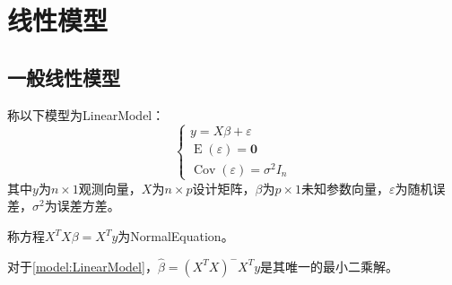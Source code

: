 \chapter{线性模型}

\section{一般线性模型}
\begin{definition}\label{model:LinearModel}
	称以下模型为\gls{LinearModel}：
	\begin{equation*}
		\begin{cases}
			y=X\beta+\varepsilon \\
			\operatorname{E}(\varepsilon)=\mathbf{0} \\
			\operatorname{Cov}(\varepsilon)=\sigma^2I_n
		\end{cases}
	\end{equation*}
	其中$y$为$n\times 1$观测向量，$X$为$n\times p$设计矩阵，$\beta$为$p\times 1$未知参数向量，$\varepsilon$为随机误差，$\sigma^2$为误差方差。
\end{definition}
\begin{definition}
	称方程$X^TX\beta=X^Ty$为\gls{NormalEquation}。
\end{definition}
\begin{theorem}
	对于\cref{model:LinearModel}，$\hat{\beta}=(X^TX)^-X^Ty$是其唯一的最小二乘解。
\end{theorem}
